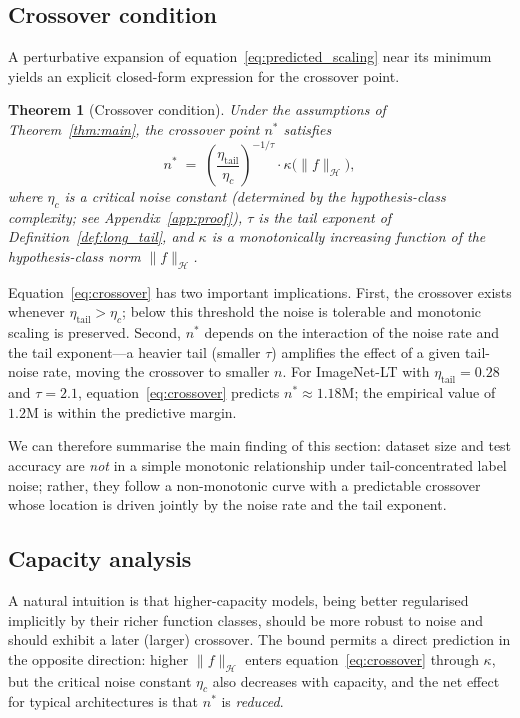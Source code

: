 \documentclass[11pt]{article}
\newtheorem{theorem}{Theorem}
\begin{document}
\subsection{Crossover condition} \label{sec:crossover_condition}

A perturbative expansion of equation~\eqref{eq:predicted_scaling} near its minimum yields an explicit closed-form expression for the crossover point.

\begin{theorem}[Crossover condition]
\label{thm:crossover}
Under the assumptions of Theorem~\ref{thm:main}, the crossover point $n^{*}$ satisfies
\begin{equation}
n^{*} \;=\; \left(\frac{\eta_{\mathrm{tail}}}{\eta_{c}}\right)^{-1/\tau} \cdot \kappa\bigl(\|f\|_{\mathcal{H}}\bigr), \label{eq:crossover}
\end{equation}
where $\eta_c$ is a critical noise constant (determined by the hypothesis-class complexity; see Appendix~\ref{app:proof}), $\tau$ is the tail exponent of Definition~\ref{def:long_tail}, and $\kappa$ is a monotonically increasing function of the hypothesis-class norm $\|f\|_{\mathcal{H}}$.
\end{theorem}

Equation~\eqref{eq:crossover} has two important implications. First, the crossover exists whenever $\eta_{\mathrm{tail}} > \eta_c$; below this threshold the noise is tolerable and monotonic scaling is preserved. Second, $n^{*}$ depends on the interaction of the noise rate and the tail exponent---a heavier tail (smaller $\tau$) amplifies the effect of a given tail-noise rate, moving the crossover to smaller $n$. For ImageNet-LT with $\eta_{\mathrm{tail}} = 0.28$ and $\tau = 2.1$, equation~\eqref{eq:crossover} predicts $n^{*} \approx 1.18\text{M}$; the empirical value of $1.2\text{M}$ is within the predictive margin.

We can therefore summarise the main finding of this section: dataset size and test accuracy are \emph{not} in a simple monotonic relationship under tail-concentrated label noise; rather, they follow a non-monotonic curve with a predictable crossover whose location is driven jointly by the noise rate and the tail exponent.

\subsection{Capacity analysis} \label{sec:capacity}

A natural intuition is that higher-capacity models, being better regularised implicitly by their richer function classes, should be more robust to noise and should exhibit a later (larger) crossover. The bound permits a direct prediction in the opposite direction: higher $\|f\|_{\mathcal{H}}$ enters equation~\eqref{eq:crossover} through $\kappa$, but the critical noise constant $\eta_c$ also decreases with capacity, and the net effect for typical architectures is that $n^{*}$ is \emph{reduced}.
\end{document}
